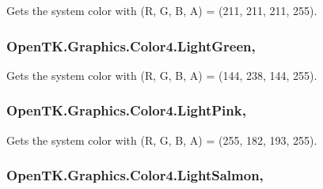 Gets the system color with (R, G, B, A) = (211, 211, 211, 255). 

\hypertarget{struct_open_t_k_1_1_graphics_1_1_color4_aa5b7c9b6b9f108a40c8adebdfa13af06}{
\subsubsection[{Light\-Green}]{ Open\-T\-K.\-Graphics.\-Color4.\-Light\-Green\hspace{0.3cm}{\ttfamily [static]}, {\ttfamily [get]}}}\label{struct_open_t_k_1_1_graphics_1_1_color4_aa5b7c9b6b9f108a40c8adebdfa13af06}


Gets the system color with (R, G, B, A) = (144, 238, 144, 255). 

\hypertarget{struct_open_t_k_1_1_graphics_1_1_color4_a4f44dbcb3460b09022d7278d17a393cd}{
\subsubsection[{Light\-Pink}]{ Open\-T\-K.\-Graphics.\-Color4.\-Light\-Pink\hspace{0.3cm}{\ttfamily [static]}, {\ttfamily [get]}}}\label{struct_open_t_k_1_1_graphics_1_1_color4_a4f44dbcb3460b09022d7278d17a393cd}


Gets the system color with (R, G, B, A) = (255, 182, 193, 255). 

\hypertarget{struct_open_t_k_1_1_graphics_1_1_color4_ac9fdf1a6201c2a7a35423fdf70362138}{
\subsubsection[{Light\-Salmon}]{ Open\-T\-K.\-Graphics.\-Color4.\-Light\-Salmon\hspace{0.3cm}{\ttfamily [static]}, {\ttfamily [get]}}}\label{struct_open_t_k_1_1_graphics_1_1_color4_ac9fdf1a6201c2a7a35423fdf70362138}


